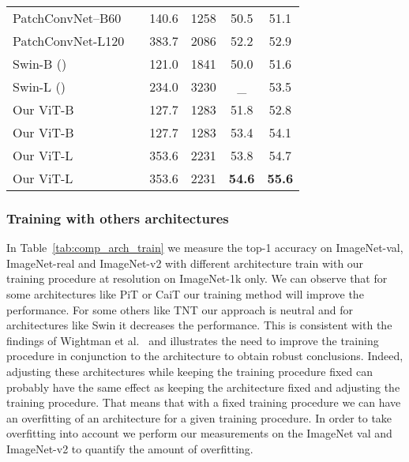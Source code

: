 \begin{table}[t]
{\begin{tabular}{l|l|cc|cc}
            

            
            
            PatchConvNet--B60 &  & 140.6 & 1258  & 50.5  & 51.1 \\

             PatchConvNet-L120 &  & 383.7 & 2086  &  52.2 & 52.9   \\
            Swin-B () &  & 121.0 & 1841  & 50.0 & 51.6 \\
            Swin-L () &  & 234.0 & 3230  & \_ & 53.5 \\
            \rowcolor{Goldenrod}
            Our ViT-B &  & 127.7 & 1283 & 51.8 & 52.8\\
            \rowcolor{Goldenrod}
            Our ViT-B &  & 127.7 & 1283 & 53.4 & 54.1\\
            \rowcolor{Goldenrod}
            Our ViT-L &  & 353.6 & 2231 &  53.8 & 54.7 \\
            \rowcolor{Goldenrod}
            Our ViT-L &  & 353.6 & 2231 &  \textbf{54.6} & \textbf{55.6} \\
        \bottomrule     
        \end{tabular}
        } 
            \bigskip 
\end{table}

\subsubsection{Training with others architectures}

In Table~\ref{tab:comp_arch_train} we measure the top-1 accuracy on ImageNet-val, ImageNet-real and ImageNet-v2 with different architecture train with our training procedure at resolution  on ImageNet-1k only. 
We can observe that for some architectures like PiT or CaiT our training method will improve the performance. For some others like TNT our approach is neutral and for architectures like Swin it decreases the performance. This is consistent with the findings of Wightman et al.~\cite{wightman2021resnet} and illustrates the need to improve the training procedure in conjunction to the architecture to obtain robust conclusions.
Indeed, adjusting these architectures while keeping the training procedure fixed can probably have the same effect as keeping the architecture fixed and adjusting the training procedure. 
That means that with a fixed training procedure we can have an overfitting of an architecture for a given training procedure.
In order to take overfitting into account we perform our measurements on the ImageNet val and ImageNet-v2 to quantify the amount of overfitting.

